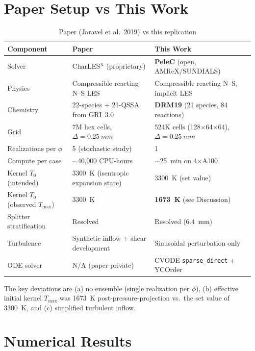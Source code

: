 \documentclass[11pt,a4paper]{article}
\begin{document}
\section{Paper Setup vs This Work}

\begin{table}[H]
\centering
\caption{Paper (Jaravel et al.\ 2019) vs this replication}
\small
\begin{tabular}{@{}lll@{}}
\toprule
\textbf{Component} & \textbf{Paper} & \textbf{This Work} \\
\midrule
Solver & CharLES$^{\mathrm{X}}$ (proprietary) & \textbf{PeleC} (open, AMReX/SUNDIALS) \\
Physics & Compressible reacting N--S LES & Compressible reacting N--S, implicit LES \\
Chemistry & 22-species $+$ 21-QSSA from GRI~3.0 & \textbf{DRM19} (21 species, 84 reactions) \\
Grid & 7M hex cells, $\Delta = \SI{0.25}{mm}$ & 524K cells (128$\times$64$\times$64), $\Delta = \SI{0.25}{mm}$ \\
Realizations per $\phi$ & 5 (stochastic study) & 1 \\
Compute per case & $\sim$40,000 CPU-hours & $\sim$25~min on 4$\times$A100 \\
Kernel $T_0$ (intended) & \SI{3300}{K} (isentropic expansion state) & \SI{3300}{K} (set value) \\
Kernel $T_0$ (observed $T_{\max}$) & \SI{3300}{K} & \textbf{\SI{1673}{K}} (see Discussion) \\
Splitter stratification & Resolved & Resolved (\SI{6.4}{mm}) \\
Turbulence & Synthetic inflow + shear development & Sinusoidal perturbation only \\
ODE solver & N/A (paper-private) & CVODE \texttt{sparse\_direct} + YCOrder \\
\bottomrule
\end{tabular}
\end{table}

The key deviations are (a) no ensemble (single realization per $\phi$), (b) effective initial kernel $T_{\max}$ was \SI{1673}{K} post-pressure-projection vs.\ the set value of \SI{3300}{K}, and (c) simplified turbulent inflow.

\section{Numerical Results}
\end{document}
